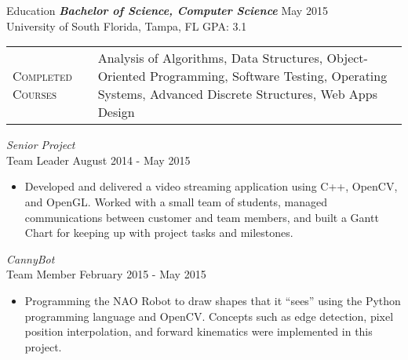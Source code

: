 \begin{section}{Education}
  {\sl \textbf{Bachelor of Science, Computer Science}} \hfill May 2015 \\
  University of South Florida, Tampa, FL \hfill GPA: 3.1 \\
  \begin{tabularx}{\linewidth}{@{}l X@{}}
    \textsc{Completed Courses} &\small{Analysis of Algorithms, Data Structures, Object-Oriented Programming, Software Testing, Operating Systems, Advanced Discrete Structures, Web Apps Design}\\
  \end{tabularx}
  {\sl Senior Project} \\ Team Leader \hfill August 2014 - May 2015
  \begin{itemize}
    \item Developed and delivered a video streaming application using C++, OpenCV, and OpenGL. Worked with a small team of students, managed communications between customer and team members, and built a Gantt Chart for keeping up with project tasks and milestones.
  \end{itemize}
  {\sl CannyBot} \\ Team Member \hfill February 2015 - May 2015
  \begin{itemize}
    \item Programming the NAO Robot to draw shapes that it ``sees'' using the Python programming language and OpenCV. Concepts such as edge detection, pixel position interpolation, and forward kinematics were implemented in this project.
  \end{itemize}
\end{section}

